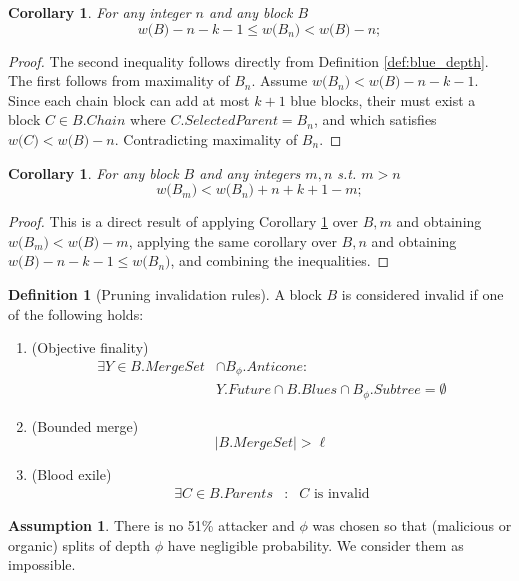 \documentclass{article}
\theoremstyle{plain}
\newtheorem{corollary}[]{Corollary}
\theoremstyle{definition}
\newtheorem{definition}[]{Definition}
\newtheorem{assumption}[]{Assumption}
\theoremstyle{remark}
\newcommand{\score}[1]{{w\bigl(#1\bigr)}}
\newcommand{\comma}[2]{
    \begin{aligned}#1 & : & #2\end{aligned}
}
\begin{document}
\begin{corollary} \label{corollary:depth_bounds}
    For any integer $n$ and any block $B$ $$\score{B} - n - k - 1 \le \score{B_n} < \score{B} - n;$$
\end{corollary}
\begin{proof}
    The second inequality follows directly from Definition \ref{def:blue_depth}. The first follows from maximality of $B_n$. Assume $\score{B_n} < \score{B} - n - k - 1$. Since each chain block can add at most $k+1$ blue blocks, their must exist a block $C \in B.Chain$ where $C.SelectedParent = B_n$, and which satisfies $ \score{C} < \score{B} - n$. Contradicting maximality of $B_n$.
\end{proof}

\begin{corollary} \label{corollary:depth_relation}
    For any block $B$ and any integers $m, n$ s.t. $m>n$ $$\score{B_m} < \score{B_n}+n+k+1 - m;$$
\end{corollary}
\begin{proof}
    This is a direct result of applying Corollary \ref{corollary:depth_bounds} over $B, m$ and obtaining $\score{B_m} < \score{B} - m$, applying the same corollary over $B, n$ and obtaining $\score{B}-n-k-1 \le \score{B_n}$, and combining the inequalities. 
\end{proof}


\begin{definition}[Pruning invalidation rules]
    A block $B$ is considered invalid if one of the following holds:
    \begin{enumerate}[(R-I)]
        \item (Objective finality) 
        \begin{align*}
            \exists Y \in B.MergeSet & \cap B_\phi.Anticone:  \\
            & Y.Future \cap B.Blues \cap B_\phi.Subtree = \emptyset
        \end{align*}
        \label{inv_fin}
        \item (Bounded merge) $$|B.MergeSet| > \ell$$ \label{inv_merge}
        \item (Blood exile) $$\comma{\exists C \in B.Parents}{C\mbox{ is invalid}} $$\label{inv_inh}
    \end{enumerate}
\end{definition}

\begin{assumption} \label{bounded_reorg}
    There is no 51\% attacker and $\phi$ was chosen so that (malicious or organic) splits of depth $\phi$ have negligible probability. We consider them as impossible.
\end{assumption}
\end{document}
